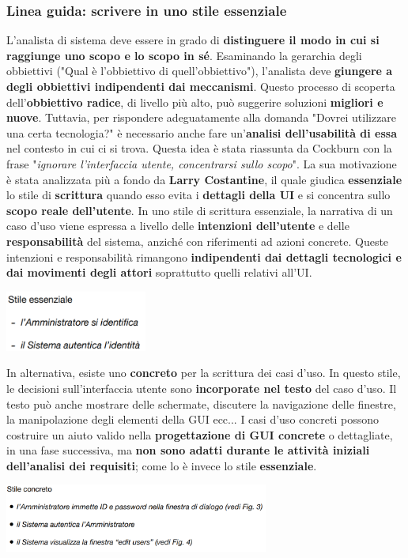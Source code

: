 \documentclass[12pt]{article}
\begin{document}
\subsubsection{Linea guida: scrivere in uno stile essenziale}
L'analista di sistema deve essere in grado di \textbf{distinguere il modo in cui si raggiunge uno scopo e lo scopo in sé}. Esaminando la gerarchia degli obbiettivi ("Qual è l'obbiettivo di quell'obbiettivo"), l'analista deve \textbf{giungere a degli obbiettivi indipendenti dai meccanismi}.
Questo processo di scoperta dell'\textbf{obbiettivo radice}, di livello più alto, può suggerire soluzioni \textbf{migliori e nuove}.
Tuttavia, per rispondere adeguatamente alla domanda "Dovrei utilizzare una certa tecnologia?" è necessario anche fare un'\textbf{analisi dell'usabilità di essa} nel contesto in cui ci si trova.
Questa idea è stata riassunta da Cockburn con la frase "\textit{ignorare l'interfaccia utente, concentrarsi sullo scopo}". La sua motivazione è stata analizzata più a fondo da \textbf{Larry Costantine}, il quale giudica \textbf{essenziale} lo stile di \textbf{scrittura} quando esso evita i \textbf{dettagli della UI} e si concentra sullo \textbf{scopo reale dell'utente}.
In uno stile di scrittura essenziale, la narrativa di un caso d'uso viene espressa a livello delle \textbf{intenzioni dell'utente} e delle \textbf{responsabilità} del sistema, anziché con riferimenti ad azioni concrete.
Queste intenzioni e responsabilità rimangono \textbf{indipendenti dai dettagli tecnologici e dai movimenti degli attori} soprattutto quelli relativi all'UI.
\begin{center}
    \includegraphics[width = 0.35\textwidth]{Images/33.png}
\end{center}
In alternativa, esiste uno \textbf{concreto} per la scrittura dei casi d'uso. In questo stile, le decisioni sull'interfaccia utente sono \textbf{incorporate nel testo} del caso d'uso.
Il testo può anche mostrare delle schermate, discutere la navigazione delle finestre, la manipolazione degli elementi della GUI ecc... 
I casi d'uso concreti possono costruire un aiuto valido nella \textbf{progettazione di GUI concrete} o dettagliate, in una fase successiva, ma \textbf{non sono adatti durante le attività iniziali dell'analisi dei requisiti}; come lo è invece lo stile \textbf{essenziale}.
\begin{center}
    \includegraphics[width = 0.65\textwidth]{Images/34.png}
\end{center}
\end{document}
